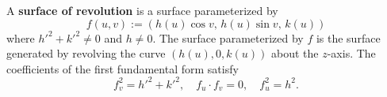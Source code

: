A \textbf{surface of revolution} is a surface parameterized by
$$f(u, v) := (h(u) \cos v, \, h(u) \sin v, \, k(u))$$
where $h'^2 + k'^2 \neq 0$ and $h \neq 0$. The surface parameterized by $f$ is the surface generated by revolving the curve $(h(u), 0, k(u))$ about the $z$-axis. The coefficients of the first fundamental form satisfy
$$f_v^2 = h'^2 + k'^2, \quad f_u \cdot f_v = 0, \quad f_u^2 = h^2.$$
